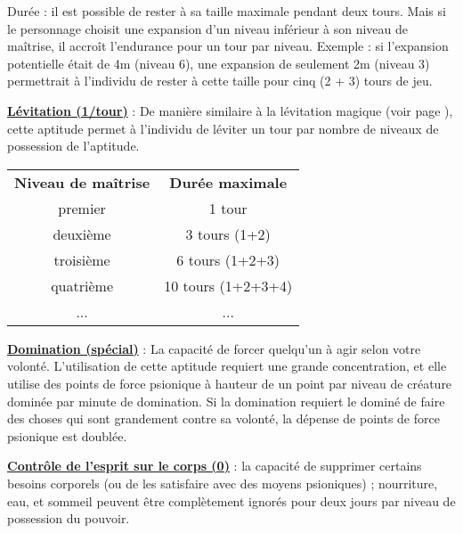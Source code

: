 Durée : il est possible de rester à sa taille maximale pendant deux tours. Mais si le personnage choisit une expansion d'un niveau inférieur à son niveau de maîtrise, il accroît l'endurance pour un tour par niveau. Exemple : si l'expansion potentielle était de 4m (niveau 6), une expansion de seulement 2m (niveau 3) permettrait à l'individu de rester à cette taille pour cinq (2 + 3) tours de jeu.

\bigskip

\label{guerrier-levitation}\textbf{\uline{Lévitation (1/tour)}} : De manière similaire à la lévitation magique (voir page \pageref{sort-levitation}), cette aptitude permet à l'individu de léviter un tour par nombre de niveaux de possession de l'aptitude.

\bigskip

\begin{tabular}{cc}
\textbf{Niveau de maîtrise} & \textbf{Durée maximale} \\
premier     & 1 tour \\
deuxième    & 3 tours (1+2) \\
troisième   & 6 tours (1+2+3) \\
quatrième   & 10 tours (1+2+3+4) \\
...         & ... \\
\end{tabular}

\bigskip

\label{guerrier-domination}\textbf{\uline{Domination (spécial)}} : La capacité de forcer quelqu'un à agir selon votre volonté. L'utilisation de cette aptitude requiert une grande concentration, et elle utilise des points de force psionique à hauteur de un point par niveau de créature dominée par minute de domination. Si la domination requiert le dominé de faire des choses qui sont grandement contre sa volonté, la dépense de points de force psionique est doublée.

\bigskip

\label{guerrier-controle-ESC}\textbf{\uline{Contrôle de l'esprit sur le corps (0)}} : la capacité de supprimer certains besoins corporels (ou de les satisfaire avec des moyens psioniques) ; nourriture, eau, et sommeil peuvent être complètement ignorés pour deux jours par niveau de possession du pouvoir.

